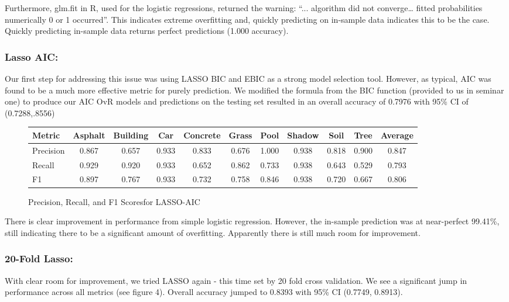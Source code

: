 \documentclass[11pt]{article}
\begin{document}
Furthermore, glm.fit in R, used for the logistic regressions, returned the warning: “... algorithm did not converge… fitted probabilities numerically 0 or 1 occurred”. This indicates extreme overfitting and, quickly predicting on in-sample data indicates this to be the case. Quickly predicting in-sample data returns perfect predictions (1.000 accuracy).\\

\subsubsection{Lasso AIC:}
Our first step for addressing this issue was using LASSO BIC and EBIC as a strong model selection tool. However, as typical, AIC was found to be a much more effective metric for purely prediction. We modified the formula from the BIC function (provided to us in seminar one) to produce our AIC OvR models and predictions on the testing set resulted in an overall accuracy of 0.7976 with 95\% CI of (0.7288,.8556)\\

\begin{figure}
  \centering
  \begin{tabular}{lcccccccccc}
    \toprule
    Metric & Asphalt & Building & Car & Concrete & Grass & Pool & Shadow & Soil & Tree & Average\\
    \midrule
    Precision & 0.867 & 0.657 & 0.933 & 0.833 & 0.676 & 1.000 & 0.938 & 0.818 & 0.900 & 0.847\\
    Recall & 0.929 & 0.920 & 0.933 & 0.652 & 0.862 & 0.733 & 0.938 & 0.643 & 0.529 & 0.793 \\
    F1 & 0.897 & 0.767 & 0.933 & 0.732 & 0.758 & 0.846 & 0.938 & 0.720 & 0.667 & 0.806\\
    \bottomrule
  \end{tabular}
  \caption{Precision, Recall, and F1 Scoresfor LASSO-AIC}
  \label{tab:precision_recall_f1_averages}
\end{figure}
 
There is clear improvement in performance from simple logistic regression. However, the in-sample prediction was at near-perfect 99.41\%, still indicating there to be a significant amount of overfitting. Apparently there is still much room for improvement.

\subsubsection{20-Fold Lasso:}
With clear room for improvement, we tried LASSO again - this time set by 20 fold cross validation. We see a significant jump in performance across all metrics (see figure 4). Overall accuracy jumped to 0.8393 with 95\% CI (0.7749, 0.8913).
\end{document}
